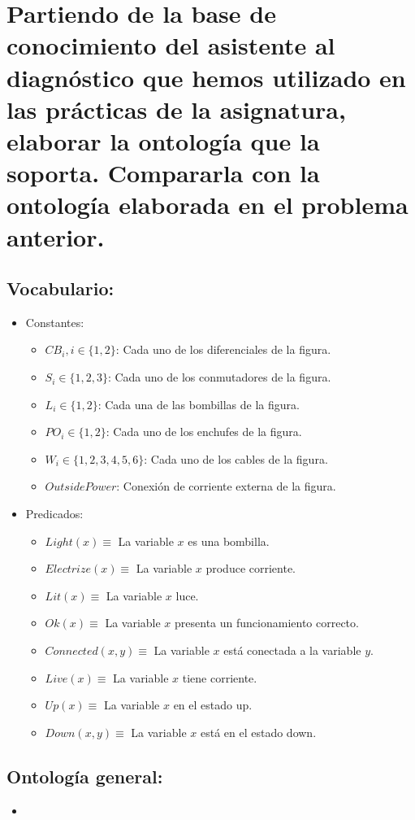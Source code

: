 \documentclass[10pt, a4paper,spanish]{article}
\begin{document}
	\section{Partiendo de la base de conocimiento del asistente al diagnóstico que hemos utilizado en las prácticas de la asignatura, elaborar la ontología que la soporta. Compararla con la ontología elaborada en el problema anterior.}

		\paragraph{}

		\subsection{Vocabulario:}
			\begin{itemize}
				\item Constantes:
				\begin{itemize}
					\item $CB_i, i \in \{1,2\}$: Cada uno de los diferenciales de la figura.
					\item $S_i \in \{1,2,3\}$:  Cada uno de los conmutadores de la figura.
					\item $L_i \in \{1,2\}$: Cada una de las bombillas de la figura.
					\item $PO_i \in \{1,2\}$: Cada uno de los enchufes de la figura.
					\item $W_i \in \{1,2,3,4,5,6\}$: Cada uno de los cables de la figura.
					\item $OutsidePower$: Conexión de corriente externa de la figura.
				\end{itemize}
				\item Predicados:
				\begin{itemize}
					\item $Light(x) \equiv$ La variable $x$ es una bombilla.
					\item $Electrize(x) \equiv$ La variable $x$ produce corriente.
					\item $Lit(x) \equiv$ La variable $x$ luce.
					\item $Ok(x) \equiv$ La variable $x$ presenta un funcionamiento correcto.
					\item $Connected(x, y) \equiv$ La variable $x$ está conectada a la variable $y$.
					\item $Live(x) \equiv$ La variable $x$ tiene corriente.
					\item $Up(x) \equiv$ La variable $x$ en el estado up.
					\item $Down(x, y) \equiv$ La variable $x$ está en el estado down.
				\end{itemize}
			\end{itemize}

		\subsection{Ontología general:}

			\begin{itemize}

				\item
			\end{itemize}
\end{document}

